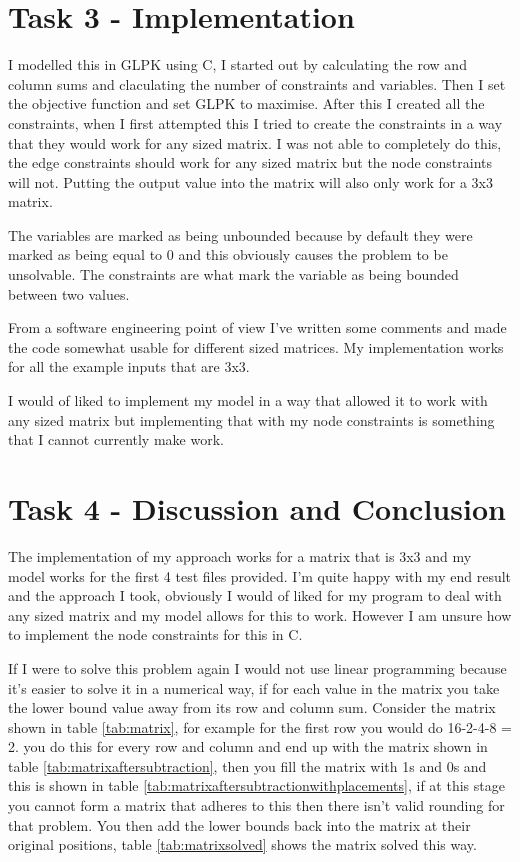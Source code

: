 \documentclass[10pt]{article}
\begin{document}
\section*{Task 3 - Implementation}

I modelled this in GLPK using C, I started out by calculating the row and column sums and claculating the number of constraints and variables. Then I set the objective function and set GLPK to maximise. After this I created all the constraints, when I first attempted this I tried to create the constraints in a way that they would work for any sized matrix. I was not able to completely do this, the edge constraints should work for any sized matrix but the node constraints will not. Putting the output value into the matrix will also only work for a 3x3 matrix. 

The variables are marked as being unbounded because by default they were marked as being equal to 0 and this obviously causes the problem to be unsolvable. The constraints are what mark the variable as being bounded between two values.

From a software engineering point of view I've written some comments and made the code somewhat usable for different sized matrices. My implementation works for all the example inputs that are 3x3. 

I would of liked to implement my model in a way that allowed it to work with any sized matrix but implementing that with my node constraints is something that I cannot currently make work.

\section*{Task 4 - Discussion and Conclusion}

The implementation of my approach works for a matrix that is 3x3 and my model works for the first 4 test files provided. I'm quite happy with my end result and the approach I took, obviously I would of liked for my program to deal with any sized matrix and my model allows for this to work. However I am unsure how to implement the node constraints for this in C.

If I were to solve this problem again I would not use linear programming because it's easier to solve it in a numerical way, if for each value in the matrix you take the lower bound value away from its row and column sum. Consider the matrix shown in table \ref{tab:matrix}, for example for the first row you would do 16-2-4-8 = 2. you do this for every row and column and end up with the matrix shown in table \ref{tab:matrixaftersubtraction}, then you fill the matrix with 1s and 0s and this is shown in table \ref{tab:matrixaftersubtractionwithplacements}, if at this stage you cannot form a matrix that adheres to this then there isn't valid rounding for that problem. You then add the lower bounds back into the matrix at their original positions, table \ref{tab:matrixsolved} shows the matrix solved this way.
\end{document}
